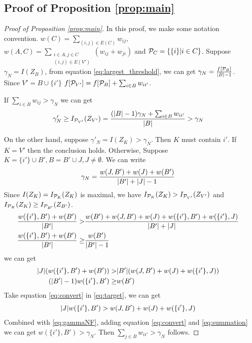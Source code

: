 \subsection{Proof of Proposition \ref{prop:main}}
\begin{proof}[Proof of Proposition \ref{prop:main}]
		In this proof, we make some notation convention.
		$w(C) = \displaystyle\sum_{(i,j) \in E(C)} w_{ij},$
		$w(A, C) = \displaystyle\sum_{\substack{i \in A, j \in C \\ (i,j) \in E(V')}} (w_{ij}+w_{ji})$ and
		$\P_C = \{\{i \}| i \in C \}$. Suppose $\gamma_N = I(Z_B)$, from equation \eqref{eq:largest_threshold}, we can get $\gamma_N =\frac{f[\P_B]} {\abs{B} -1}$.
		Since $V' = B \cup \{i'\}$
		$f[\P_{V'}] = f[\P_B] + \sum_{i \in B}w_{ii'}$.
		
		If $ \sum_{i \in B} w_{ij} > \gamma_N$ we can get
		$$
		\gamma'_N \geq I_{\P_{V'}}(Z_{V'}) = \frac{(\abs{B}-1)\gamma_N + \sum_{i \in B}w_{ii'}}{\abs{B}} > \gamma_N
		$$
		
		On the other hand, suppose $\gamma'_N = I(Z_K) > \gamma_N$. Then $K$ must contain $i'$. If $K=V'$ then the conclusion holds. Otherwise, Suppose $K = \{i'\} \cup B', B=B'\cup J, J\neq \emptyset$. We can write 
		\begin{equation}\label{eq:gammaNF}
		\gamma_N = \frac{w(J,B') + w(J) + w(B')}{ \abs{B'} + \abs{J} - 1 }
		\end{equation}
		Since $I(Z_K) = I_{\P_K}(Z_K)$ is maximal, we have $I_{\P_K}(Z_K) > I_{\P_{V'}}(Z_{V'})$ and $I_{\P_K}(Z_K) \geq I_{\P_{B'}}(Z_{B'})$.
		\begin{align*}
			\frac{w(\{i'\}, B') + w(B')}{\abs{B'}} >& \frac{w(B') + w(J, B') + w(J) + w(\{i'\}, B') + w(\{i'\}, J)}{\abs{B'} + \abs{J}}  \\
			\frac{w(\{i'\}, B') + w(B')}{\abs{B'}} \geq & \frac{w(B')}{\abs{B'} - 1}
		\end{align*}
		we can get 
		\begin{align}
			\abs{J} (w(\{i'\}, B') + w(B')) > & \abs{B'} (w(J, B') + w(J) + w(\{i'\}, J)) \label{eq:target}
			\\
			(\abs{B'} - 1)  w(\{i'\}, B') \geq & w(B') \label{eq:convert}
		\end{align}
		Take equation \eqref{eq:convert} in \eqref{eq:target}, we can get
		\begin{equation}\label{eq:summation}
		\abs{J} w(\{i'\}, B') > w(J, B') + w(J) + w(\{i'\}, J)
		\end{equation}	
		Combined with \eqref{eq:gammaNF}, adding equation \eqref{eq:convert} and \eqref{eq:summation} we can get
		$w(\{i'\}, B') > \gamma_N$. Then $\sum_{j \in B}w_{ii'} > \gamma_N $ follows.
\end{proof}

